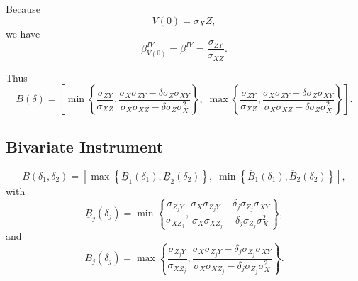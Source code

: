 \documentclass[12pt]{article}
\begin{document}
Because
\[
V(0)=\sigma_X Z,
\]
we have
\[
\beta^{IV}_{V(0)}
=
\beta^{IV}
=
\frac{\sigma_{ZY}}{\sigma_{XZ}}.
\]

Thus
\[
B(\delta)
=
\left[
\min\left\{
\frac{\sigma_{ZY}}{\sigma_{XZ}},
\frac{
\sigma_X\sigma_{ZY}
-
\delta\sigma_Z\sigma_{XY}
}{
\sigma_X\sigma_{XZ}
-
\delta\sigma_Z\sigma_X^2
}
\right\},
\;
\max\left\{
\frac{\sigma_{ZY}}{\sigma_{XZ}},
\frac{
\sigma_X\sigma_{ZY}
-
\delta\sigma_Z\sigma_{XY}
}{
\sigma_X\sigma_{XZ}
-
\delta\sigma_Z\sigma_X^2
}
\right\}
\right].
\]

\subsection{Bivariate Instrument}

\[
B(\delta_1,\delta_2)
=
\left[
\max\left\{
\underline B_1(\delta_1),
\underline B_2(\delta_2)
\right\},
\;
\min\left\{
\overline B_1(\delta_1),
\overline B_2(\delta_2)
\right\}
\right],
\]
with 
\[
\underline B_j(\delta_j)
=
\min\left\{
\frac{\sigma_{Z_jY}}{\sigma_{XZ_j}},
\frac{
\sigma_X\sigma_{Z_jY}
-
\delta_j\sigma_{Z_j}\sigma_{XY}
}{
\sigma_X\sigma_{XZ_j}
-
\delta_j\sigma_{Z_j}\sigma_X^2
}
\right\},
\]
and
\[
\overline B_j(\delta_j)
=
\max\left\{
\frac{\sigma_{Z_jY}}{\sigma_{XZ_j}},
\frac{
\sigma_X\sigma_{Z_jY}
-
\delta_j\sigma_{Z_j}\sigma_{XY}
}{
\sigma_X\sigma_{XZ_j}
-
\delta_j\sigma_{Z_j}\sigma_X^2
}
\right\}.
\]
\end{document}
